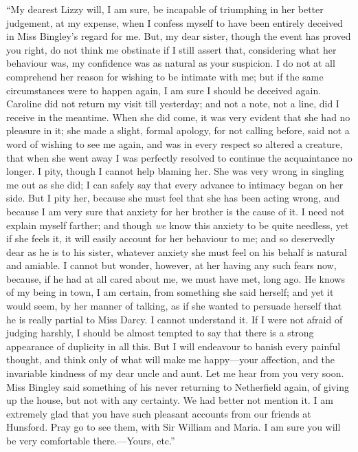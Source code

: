 ``My dearest Lizzy will, I am sure, be incapable of triumphing in
her better judgement, at my expense, when I confess myself to
have been entirely deceived in Miss Bingley's regard for me.
But, my dear sister, though the event has proved you right, do
not think me obstinate if I still assert that, considering what
her behaviour was, my confidence was as natural as your suspicion.
I do not at all comprehend her reason for wishing to be intimate
with me; but if the same circumstances were to happen again, I
am sure I should be deceived again.  Caroline did not return my
visit till yesterday; and not a note, not a line, did I receive
in the meantime.  When she did come, it was very evident that she
had no pleasure in it; she made a slight, formal apology, for not
calling before, said not a word of wishing to see me again, and
was in every respect so altered a creature, that when she went
away I was perfectly resolved to continue the acquaintance no
longer.  I pity, though I cannot help blaming her.  She was very
wrong in singling me out as she did; I can safely say that every
advance to intimacy began on her side.  But I pity her, because
she must feel that she has been acting wrong, and because I am
very sure that anxiety for her brother is the cause of it.  I need
not explain myself farther; and though \emph{we} know this anxiety to
be quite needless, yet if she feels it, it will easily account
for her behaviour to me; and so deservedly dear as he is to his
sister, whatever anxiety she must feel on his behalf is natural
and amiable.  I cannot but wonder, however, at her having any
such fears now, because, if he had at all cared about me, we
must have met, long ago.  He knows of my being in town, I am
certain, from something she said herself; and yet it would seem,
by her manner of talking, as if she wanted to persuade herself
that he is really partial to Miss Darcy.  I cannot understand it.
If I were not afraid of judging harshly, I should be almost
tempted to say that there is a strong appearance of duplicity in
all this.  But I will endeavour to banish every painful thought,
and think only of what will make me happy---your affection, and
the invariable kindness of my dear uncle and aunt.  Let me hear
from you very soon.  Miss Bingley said something of his never
returning to Netherfield again, of giving up the house, but not
with any certainty.  We had better not mention it.  I am extremely
glad that you have such pleasant accounts from our friends at
Hunsford.  Pray go to see them, with Sir William and Maria.  I am
sure you will be very comfortable there.---Yours, etc.''

